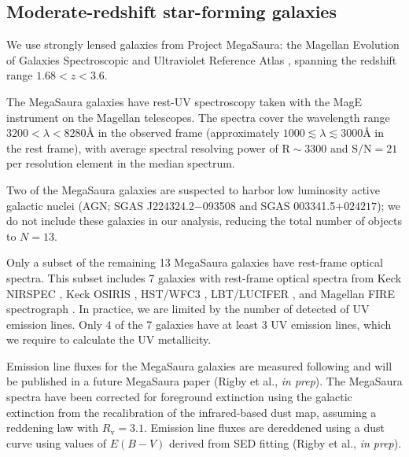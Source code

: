 \documentclass[trackchanges, preprint2]{aastex62}
\newcommand{\ang}{\ensuremath{\mbox{\AA}}\xspace}
\newcommand{\mage}{{\sc Meg}a{\sc S}a{\sc ura}\xspace}
\newcommand{\SN}{\ensuremath{\mathrm{S}/\mathrm{N}}\xspace}
\begin{document}
\subsection{Moderate-redshift star-forming galaxies}\label{sec:data:mage}

We use strongly lensed galaxies from Project \mage: the Magellan Evolution of Galaxies Spectroscopic and Ultraviolet Reference Atlas \citep{Rigby+2018a, Rigby+2018b}, spanning the redshift range $1.68 < z < 3.6$.

The \mage galaxies have rest-UV spectroscopy taken with the MagE instrument on the Magellan telescopes. The spectra cover the wavelength range $3200 < \lambda < 8280$\ang in the observed frame (approximately $1000 \lesssim \lambda \lesssim 3000$\ang in the rest frame), with average spectral resolving power of $\mathrm{R}\sim3300$ and $\SN=21$ per resolution element in the median spectrum.

Two of the \mage galaxies are suspected to harbor low luminosity active galactic nuclei (AGN; SGAS J224324.2$-$093508 and SGAS 003341.5$+024217$); we do not include these galaxies in our analysis, reducing the total number of objects to $N=13$.

Only a subset of the remaining 13 \mage galaxies have rest-frame optical spectra. This subset includes 7 galaxies with rest-frame optical spectra from Keck NIRSPEC \citep{Rigby+2011, Wuyts+2012a}, Keck OSIRIS \citep{Wuyts+2014}, HST/WFC3 \citep{Whitaker+2014}, LBT/LUCIFER \citep{Bian+2010}, and Magellan FIRE spectrograph \citep{Rivera+2017}. In practice, we are limited by the number of detected of UV emission lines. Only 4 of the 7 galaxies have at least 3 UV emission lines, which we require to calculate the UV metallicity.

Emission line fluxes for the \mage galaxies are measured following \citet{Acharyya+2019} and will be published in a future \mage paper (Rigby et al., \emph{in prep}). The \mage spectra have been corrected for foreground extinction using the galactic extinction from the \citet{Schlafly+2011} recalibration of the \citet{Schlegel+1998} infrared-based dust map, assuming a \citet{Fitzpatrick+1999} reddening law with $R_{\mathrm{v}} = 3.1$. Emission line fluxes are dereddened using a \citet{Cardelli+1989} dust curve using values of $E(B-V)$ derived from SED fitting (Rigby et al., \emph{in prep}).
\end{document}
